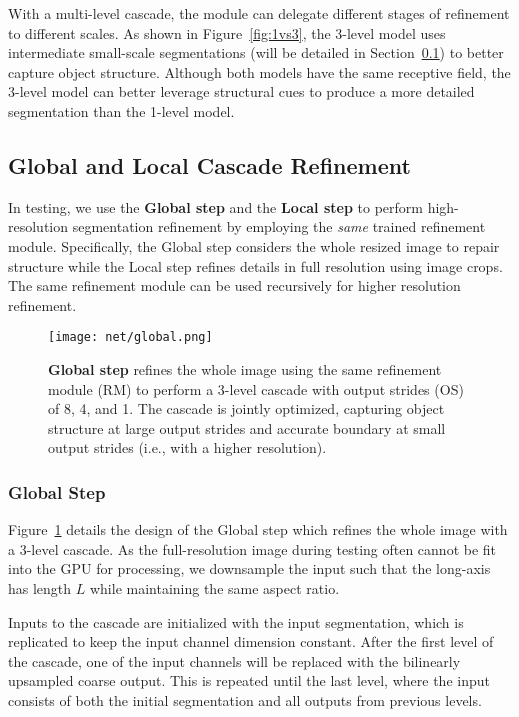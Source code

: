 \documentclass[10pt,twocolumn,letterpaper]{article}
\begin{document}
With a multi-level cascade, the module can delegate different stages of refinement to different scales. 
As shown in Figure~\ref{fig:1vs3},  the 3-level model uses intermediate small-scale segmentations (will be detailed in Section~\ref{sec:cascade}) to better capture object structure. 
Although both models have the same receptive field, the 3-level model can better leverage structural cues to produce a more detailed segmentation than the 1-level model.


\subsection{Global and Local Cascade Refinement} \label{sec:cascade}
In testing, we use the \textbf{Global step} and the \textbf{Local step} to perform high-resolution segmentation refinement by employing the {\em same} trained refinement module. Specifically, the Global step considers the whole resized image to repair structure while the Local step refines details in full resolution using image crops. The same refinement module can be used recursively for higher resolution refinement.


\begin{figure}[t]
\begin{center}
    \texttt{[image: net/global.png]}
\end{center}
    \vspace{-0.15in}
	\caption{\textbf{Global step} refines the whole image using the same refinement module (RM) to perform a 3-level cascade with output strides (OS) of 8, 4, and 1. The cascade is jointly optimized, capturing object structure at large output strides and accurate boundary at small output strides (i.e., with a higher resolution).
	}
	\label{fig:global_fig}
	\vspace{-0.15in}
\end{figure}

\subsubsection{Global Step}
Figure~\ref{fig:global_fig} details the design of the Global step which refines the whole image with a 3-level cascade. As the full-resolution image during testing often cannot be fit into the GPU for processing, we downsample the input such that the long-axis has length $L$ while maintaining the same aspect ratio. 

Inputs to the cascade are initialized with the input segmentation, which is replicated to keep the input channel dimension
constant. 
After the first level of the cascade, one of the input channels will be replaced with the bilinearly upsampled coarse output. 
This is repeated until the last level, where the input consists of both the initial segmentation and all outputs from previous levels. 
\end{document}
